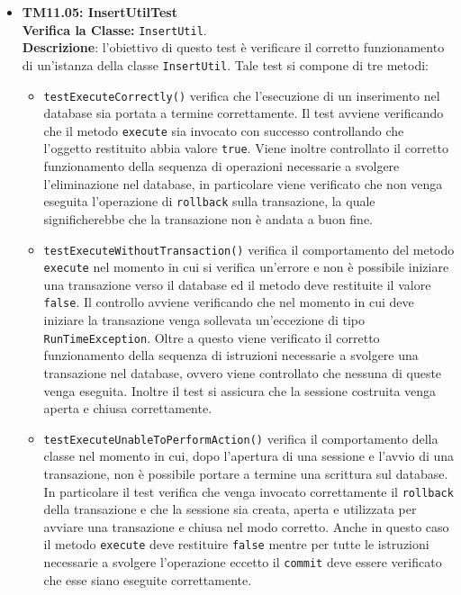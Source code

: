 \begin{itemize}
\item \textbf{TM11.05: InsertUtilTest}\\
\textbf{Verifica la Classe:} \texttt{InsertUtil}.\\
\textbf{Descrizione}: l'obiettivo di questo test è verificare il corretto funzionamento di un'istanza della classe \texttt{InsertUtil}.
Tale test si compone di tre metodi:
\begin{itemize}
\item \texttt{testExecuteCorrectly()} 
verifica che l'esecuzione di un inserimento nel database sia portata a termine correttamente. Il test avviene verificando che il metodo \texttt{execute} sia invocato con successo controllando che l'oggetto restituito abbia valore \texttt{true}. Viene inoltre controllato il corretto funzionamento della sequenza di operazioni necessarie a svolgere l'eliminazione nel database, in particolare viene verificato che non venga eseguita l'operazione di \texttt{rollback} sulla transazione, la quale significherebbe che la transazione non è andata a buon fine.

\item \texttt{testExecuteWithoutTransaction()}  verifica il comportamento del metodo \\ \texttt{execute} nel momento in cui si verifica un'errore e non è possibile iniziare una transazione verso il database ed il metodo deve restituite il valore \texttt{false}. Il controllo avviene verificando che nel momento in cui deve iniziare la transazione venga sollevata un'eccezione di tipo \texttt{RunTimeException}. Oltre a questo viene verificato il corretto funzionamento della sequenza di istruzioni necessarie a svolgere una transazione nel database, ovvero viene controllato che nessuna di queste venga eseguita. Inoltre il test si assicura che la sessione costruita venga aperta e chiusa correttamente.

\item \texttt{testExecuteUnableToPerformAction()} verifica il comportamento della classe nel momento in cui, dopo l'apertura di una sessione e l'avvio di una transazione, non è possibile portare a termine una scrittura sul database. In particolare il test verifica che venga invocato correttamente il \texttt{rollback} della transazione e che la sessione sia creata, aperta e utilizzata per avviare una transazione e chiusa nel modo corretto. Anche in questo caso il metodo \texttt{execute} deve restituire \texttt{false} mentre per tutte le istruzioni necessarie a svolgere l'operazione eccetto il \texttt{commit} deve essere verificato che esse siano eseguite correttamente.


\end{itemize}
\end{itemize}
